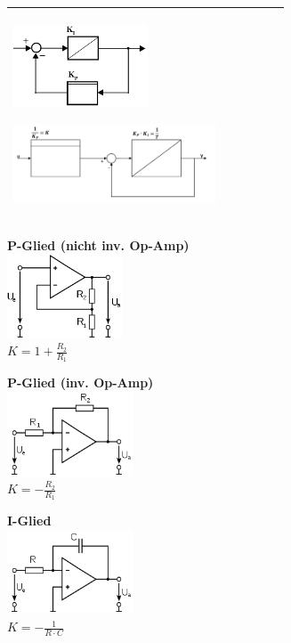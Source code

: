 \begin{tabular}{|l|l|l|l|l|l|}
{{    				\begin{minipage}{10cm}
    				    \hspace*{4cm}
    				    \includegraphics[width=4cm]{./bilder/PT1.png}
    				\end{minipage}
    				\begin{minipage}{7cm}
    					\includegraphics[width=6cm]{./bilder/PT1_2.png}
    				\end{minipage}
    		}
    	}\\
    	\hline

    \end{tabular}
		
    

    \begin{multicols}{3}
    \textbf{P-Glied (nicht inv. Op-Amp)} \\
    \includegraphics[height=2.5cm]{./bilder/OP-Amp.png} \\
    $K = 1 + \frac{R_2}{R_1}$ 
    \columnbreak

	\textbf{P-Glied (inv. Op-Amp)} \\ 
	\includegraphics[height=2.5cm]{./bilder/OP-InvAmp.png} \\
	$K=-\frac{R_2}{R_1}$
    \columnbreak
        
    \textbf{I-Glied} \\ 
    \includegraphics[height=2.5cm]{./bilder/OP-Integrator.png}\\
    $K = - \frac{1}{R \cdot C}$
    
    \end{multicols}
    
